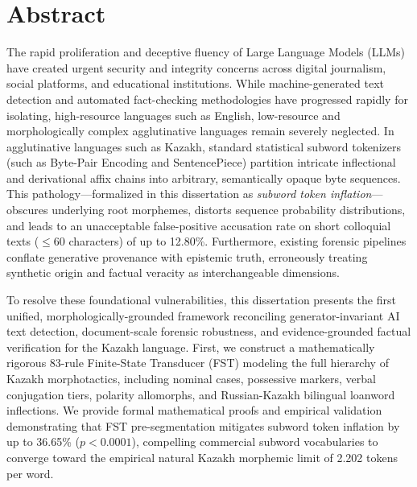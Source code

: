 \chapter*{Abstract}

The rapid proliferation and deceptive fluency of Large Language Models (LLMs) have created urgent security and integrity concerns across digital journalism, social platforms, and educational institutions. While machine-generated text detection and automated fact-checking methodologies have progressed rapidly for isolating, high-resource languages such as English, low-resource and morphologically complex agglutinative languages remain severely neglected. In agglutinative languages such as Kazakh, standard statistical subword tokenizers (such as Byte-Pair Encoding and SentencePiece) partition intricate inflectional and derivational affix chains into arbitrary, semantically opaque byte sequences. This pathology---formalized in this dissertation as \textit{subword token inflation}---obscures underlying root morphemes, distorts sequence probability distributions, and leads to an unacceptable false-positive accusation rate on short colloquial texts ($\le 60$ characters) of up to 12.80\%. Furthermore, existing forensic pipelines conflate generative provenance with epistemic truth, erroneously treating synthetic origin and factual veracity as interchangeable dimensions.

To resolve these foundational vulnerabilities, this dissertation presents the first unified, morphologically-grounded framework reconciling generator-invariant AI text detection, document-scale forensic robustness, and evidence-grounded factual verification for the Kazakh language. First, we construct a mathematically rigorous 83-rule Finite-State Transducer (FST) modeling the full hierarchy of Kazakh morphotactics, including nominal cases, possessive markers, verbal conjugation tiers, polarity allomorphs, and Russian-Kazakh bilingual loanword inflections. We provide formal mathematical proofs and empirical validation demonstrating that FST pre-segmentation mitigates subword token inflation by up to 36.65\% ($p < 0.0001$), compelling commercial subword vocabularies to converge toward the empirical natural Kazakh morphemic limit of 2.202 tokens per word. 

